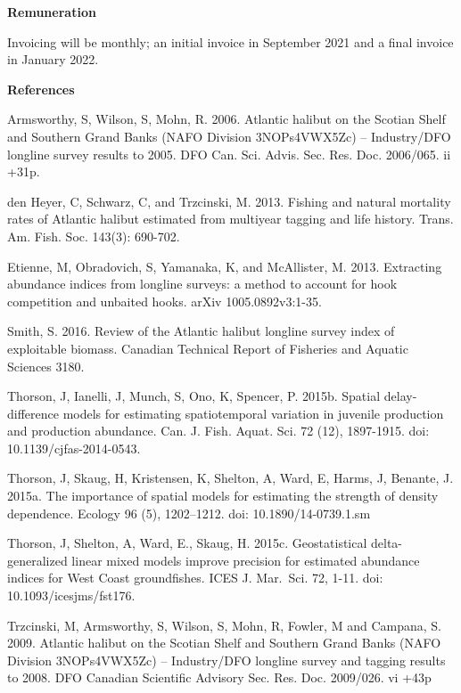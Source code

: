 \documentclass[12pt]{article}\usepackage[]{graphicx}\usepackage[]{color}
\begin{document}
\begin{appendices}
\textbf{Remuneration}

Invoicing will be monthly; an initial invoice in September 2021 and a final invoice in January 2022.

\textbf{References}

Armsworthy, S, Wilson, S, Mohn, R. 2006. Atlantic halibut on the Scotian Shelf and Southern Grand Banks (NAFO Division 3NOPs4VWX5Zc) -- Industry/DFO longline survey results to 2005. DFO Can. Sci. Advis. Sec. Res. Doc. 2006/065. ii +31p.

den Heyer, C, Schwarz, C, and Trzcinski, M. 2013. Fishing and natural mortality rates of Atlantic halibut estimated from multiyear tagging and life history. Trans. Am. Fish. Soc. 143(3): 690-702.

Etienne, M, Obradovich, S, Yamanaka, K, and McAllister, M. 2013. Extracting abundance indices from longline surveys: a method to account for hook competition and unbaited hooks. arXiv 1005.0892v3:1-35.

Smith, S. 2016. Review of the Atlantic halibut longline survey index of exploitable biomass. Canadian Technical Report of Fisheries and Aquatic Sciences 3180.

Thorson, J, Ianelli, J, Munch, S, Ono, K, Spencer, P. 2015b. Spatial delay-difference models for estimating spatiotemporal variation in juvenile production and production abundance. Can. J. Fish. Aquat. Sci. 72 (12), 1897-1915. doi: 10.1139/cjfas-2014-0543.

Thorson, J, Skaug, H, Kristensen, K, Shelton, A, Ward, E, Harms, J, Benante, J. 2015a. The importance of spatial models for estimating the strength of density dependence. Ecology 96 (5), 1202--1212. doi: 10.1890/14-0739.1.sm

Thorson, J, Shelton, A, Ward, E., Skaug, H. 2015c. Geostatistical delta-generalized linear mixed models improve precision for estimated abundance indices for West Coast groundfishes. ICES J. Mar.~Sci. 72, 1-11. doi: 10.1093/icesjms/fst176.

Trzcinski, M, Armsworthy, S, Wilson, S, Mohn, R, Fowler, M and Campana, S. 2009. Atlantic halibut on the Scotian Shelf and Southern Grand Banks (NAFO Division 3NOPs4VWX5Zc) -- Industry/DFO longline survey and tagging results to 2008. DFO Canadian Scientific Advisory Sec. Res. Doc. 2009/026. vi +43p

\section{}
\label{app:second-appendix}
\begin{figure}[htb]


\end{figure}
\end{appendices}
\end{document}
